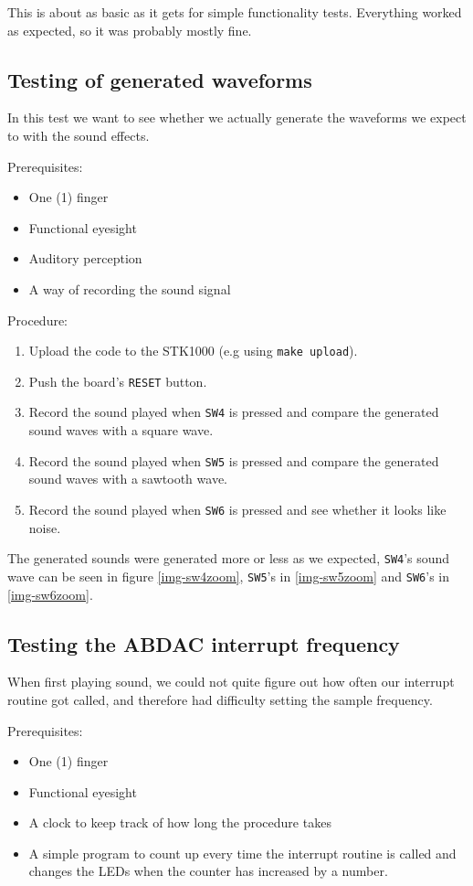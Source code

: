 This is about as basic as it gets for simple functionality tests. Everything worked as expected, so it was probably mostly fine.

\subsection{Testing of generated waveforms}

In this test we want to see whether we actually generate the waveforms we expect to with the sound effects.

Prerequisites:
\begin{itemize}
    \item{One (1) finger}
    \item{Functional eyesight}
    \item{Auditory perception}
    \item{A way of recording the sound signal}
\end{itemize}

Procedure:
\begin{enumerate}
    \item{Upload the code to the STK1000 (e.g using \texttt{make upload}).}
    \item{Push the board's \texttt{RESET} button.}
    \item{Record the sound played when \texttt{SW4} is pressed and compare the generated sound waves with a square wave.}
    \item{Record the sound played when \texttt{SW5} is pressed and compare the generated sound waves with a sawtooth wave.}
    \item{Record the sound played when \texttt{SW6} is pressed and see whether it looks like noise.}
\end{enumerate}

The generated sounds were generated more or less as we expected, \texttt{SW4}'s sound wave can be seen in figure \ref{img-sw4zoom}, \texttt{SW5}'s in \ref{img-sw5zoom} and \texttt{SW6}'s in \ref{img-sw6zoom}.

\subsection{Testing the ABDAC interrupt frequency}

When first playing sound, we could not quite figure out how often our interrupt routine got called, and therefore had difficulty setting the sample frequency.

Prerequisites:
\begin{itemize}
    \item{One (1) finger}
    \item{Functional eyesight}
    \item{A clock to keep track of how long the procedure takes}
    \item{A simple program to count up every time the interrupt routine is called and changes the LEDs when the counter has increased by a number.}
\end{itemize}

